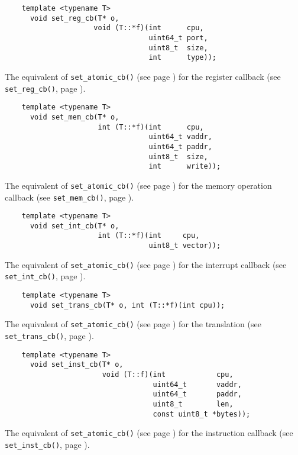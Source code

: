 \documentclass[letterpaper, 10pt]{book}
\begin{document}
\label{tf:set_reg_cb} \begin{verbatim} 
    template <typename T>
      void set_reg_cb(T* o,
                     void (T::*f)(int      cpu,
                                  uint64_t port,
                                  uint8_t  size,
                                  int      type));
\end{verbatim}
The equivalent of \texttt{set\_atomic\_cb()} (see page
\pageref{tf:set_atomic_cb}) for the register callback (see 
\texttt{set\_reg\_cb()}, page \pageref{func:set_reg_cb}).


\label{tf:set_mem_cb} \begin{verbatim}
    template <typename T>
      void set_mem_cb(T* o,
                      int (T::*f)(int      cpu,
                                  uint64_t vaddr, 
                                  uint64_t paddr,
                                  uint8_t  size,
                                  int      write));
\end{verbatim}
The equivalent of \texttt{set\_atomic\_cb()} (see page 
\pageref{tf:set_atomic_cb}) for the memory operation callback (see 
\texttt{set\_mem\_cb()}, page \pageref{func:set_mem_cb}).

\label{tf:set_int_cb} \begin{verbatim}
    template <typename T>
      void set_int_cb(T* o,
                      int (T::*f)(int     cpu, 
                                  uint8_t vector));
\end{verbatim}
The equivalent of \texttt{set\_atomic\_cb()} (see page
\pageref{tf:set_atomic_cb}) for the interrupt callback (see 
\texttt{set\_int\_cb()}, page \pageref{func:set_int_cb}).

\label{tf:set_int_cb} \begin{verbatim}
    template <typename T>
      void set_trans_cb(T* o, int (T::*f)(int cpu));
\end{verbatim}
The equivalent of \texttt{set\_atomic\_cb()} (see page
\pageref{tf:set_atomic_cb}) for the translation (see
\texttt{set\_trans\_cb()}, page \pageref{func:set_trans_cb}).

\label{tf:set_inst_cb} \begin{verbatim}
    template <typename T>
      void set_inst_cb(T* o,
                       void (T::f)(int            cpu,
                                   uint64_t       vaddr,
                                   uint64_t       paddr,
                                   uint8_t        len,
                                   const uint8_t *bytes));
\end{verbatim}
The equivalent of \texttt{set\_atomic\_cb()} (see page
\pageref{tf:set_atomic_cb}) for the instruction callback (see 
\texttt{set\_inst\_cb()}, page \pageref{func:set_inst_cb}).
\end{document}
